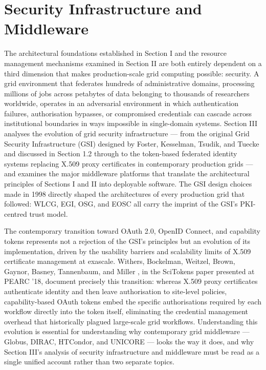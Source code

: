 \documentclass[12pt,a4paper]{report}
\begin{document}
\section*{Security Infrastructure and Middleware}
The architectural foundations established in Section I and the resource management mechanisms examined in Section II are both entirely dependent on a 
third dimension that makes production-scale grid computing possible: security. A grid environment that federates hundreds of administrative domains,
 processing millions of jobs across petabytes of data belonging to thousands of researchers worldwide, operates in an adversarial environment in which
  authentication failures, authorisation bypasses, or compromised credentials can cascade across institutional boundaries in ways impossible in 
  single-domain systems. Section III analyses the evolution of grid security infrastructure — from the original Grid Security Infrastructure (GSI)
   designed by Foster, Kesselman, Tsudik, and Tuecke \parencite{foster1998} and discussed in Section 1.2 through to the token-based federated identity systems 
   replacing X.509 proxy certificates in contemporary production grids — and examines the major middleware platforms that translate the architectural
    principles of Sections I and II into deployable software. The GSI design choices made in 1998 directly shaped the architectures of every production 
    grid that followed: WLCG, EGI, OSG, and EOSC all carry the imprint of the GSI’s PKI-centred trust model. 
    
    The contemporary transition toward 
    OAuth 2.0, OpenID Connect, and capability tokens represents not a rejection of the GSI’s principles but an evolution of its implementation, 
    driven by the usability barriers and scalability limits of X.509 certificate management at exascale. Withers, Bockelman, Weitzel, Brown, Gaynor, 
    Basney, Tannenbaum, and Miller \parencite{withers2018scitokens}, in the SciTokens paper presented at PEARC ’18, document precisely this transition: whereas X.509 proxy 
    certificates authenticate identity and then leave authorisation to site-level policies, capability-based OAuth tokens embed the specific 
    authorisations required by each workflow directly into the token itself, eliminating the credential management overhead that historically 
    plagued large-scale grid workflows. Understanding this evolution is essential for understanding why contemporary grid middleware — Globus,
     DIRAC, HTCondor, and UNICORE — looks the way it does, and why Section III’s analysis of security infrastructure and middleware must be read 
     as a single unified account rather than two separate topics.
\end{document}
